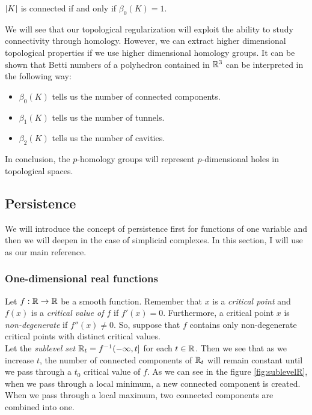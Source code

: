 \documentclass[../main.tex]{subfiles}
\begin{document}
\begin{corollary}
$\left\lvert K \right\rvert$ is connected if and only if $\beta_0(K)=1$.
\end{corollary}

We will see that our topological regularization will exploit the ability to study connectivity through homology. However, we can extract higher dimensional topological properties if we use higher dimensional homology groups. It can be shown \cite[Chapter~5]{edelsbrunner_computational_2010} that Betti numbers of a polyhedron contained in $\mathbb{R}^3$ can be interpreted in the following way:
\begin{itemize}
\item $\beta_0(K)$ tells us the number of connected components.
\item $\beta_1(K)$ tells us the number of tunnels.
\item $\beta_2(K)$ tells us the number of cavities.
\end{itemize}

In conclusion, the $p$-homology groups will represent $p$-dimensional holes in topological spaces.

\subsection{Persistence}
We will introduce the concept of persistence first for functions of one variable and then we will deepen in the case of simplicial complexes. In this section, I will use \cite{goodman_persistent_2008} as our main reference.

\subsubsection*{One-dimensional real functions}
Let $f: \mathbb{R} \to \mathbb{R}$ be a smooth function. Remember that $x$ is a \emph{critical point} and $f(x)$ is a \emph{critical value of $f$} if $f'(x)=0$. Furthermore, a critical point $x$ is \emph{non-degenerate} if $f''(x) \neq 0$. So, suppose that $f$ contains only non-degenerate critical points with distinct critical values.\\

Let the \emph{sublevel set} $\mathbb{R}_t=f^{-1}(-\infty, t]$ for each $t \in \mathbb{R}$. Then we see that as we increase $t$, the number of connected components of $\mathbb{R}_t$ will remain constant until we pass through a $t_0$ critical value of $f$.  As we can see in the figure \ref{fig:sublevelR}, when we pass through a local minimum, a new connected component is created. When we pass through a local maximum, two connected components are combined into one.\\
\end{document}
